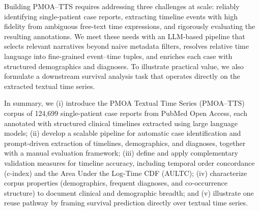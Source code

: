 Building PMOA--TTS requires addressing three challenges at scale: reliably identifying single-patient case reports, extracting timeline events with high fidelity from ambiguous free-text time expressions, and rigorously evaluating the resulting annotations. We meet these needs with an LLM-based pipeline that selects relevant narratives beyond naive metadata filters, resolves relative time language into fine-grained event--time tuples, and enriches each case with structured demographics and diagnoses. To illustrate practical value, we also formulate a downstream survival analysis task that operates directly on the extracted textual time series.





In summary, we (i) introduce the PMOA Textual Time Series (PMOA--TTS) corpus of 124{,}699 single-patient case reports from PubMed Open Access, each annotated with structured clinical timelines extracted using large language models; (ii) develop a scalable pipeline for automatic case identification and prompt-driven extraction of timelines, demographics, and diagnoses, together with a manual evaluation framework; (iii) define and apply complementary validation measures for timeline accuracy, including temporal order concordance (c-index) and the Area Under the Log-Time CDF (AULTC); (iv) characterize corpus properties (demographics, frequent diagnoses, and co-occurrence structure) to document clinical and demographic breadth; and (v) illustrate one reuse pathway by framing survival prediction directly over textual time series.



